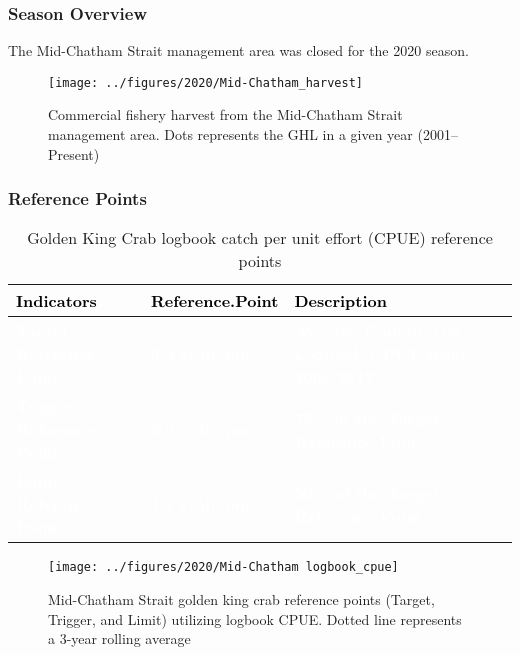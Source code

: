 \documentclass[]{article}
\begin{document}
\subsubsection{Season Overview}\label{season-overview-4}

The Mid-Chatham Strait management area was closed for the 2020 season.

\begin{figure}[H]
\texttt{[image: ../figures/2020/Mid-Chatham\_harvest]} \caption{Commercial fishery harvest from the Mid-Chatham Strait management area. Dots represents the GHL in a given year (2001–Present)}\label{fig:unnamed-chunk-14}
\end{figure}

\subsubsection{Reference Points}\label{reference-points-5}

\begin{table}[!h]

\caption{\label{tab:unnamed-chunk-15}Golden King Crab logbook catch per unit effort (CPUE) reference points}
\centering
\begin{tabular}[t]{l|l|l}
\hline
\textcolor{black}{\textbf{Indicators}} & \textcolor{black}{\textbf{Reference.Point}} & \textcolor{black}{\textbf{Description}}\\
\hline
\rowcolor{gray!6}  \rowcolor{olive}  \textcolor{white}{\textbf{Target Reference Point}} & \textcolor{white}{\textbf{3.4 crab/pot}} & \textcolor{white}{\textbf{Average Commercial Logbook CPUE from 2000-2017}}\\
\hline
\rowcolor{orange}  \textcolor{white}{\textbf{Trigger Reference Point}} & \textcolor{white}{\textbf{2.5 crab/pot}} & \textcolor{white}{\textbf{75\% of the Target Reference Point}}\\
\hline
\rowcolor{gray!6}  \rowcolor{red}  \textcolor{white}{\textbf{Limit Reference Point}} & \textcolor{white}{\textbf{1.7 crab/pot}} & \textcolor{white}{\textbf{50\% of the Target Reference Point}}\\
\hline
\end{tabular}
\end{table}

\begin{figure}[H]
\texttt{[image: ../figures/2020/Mid-Chatham logbook\_cpue]} \caption{Mid-Chatham Strait golden king crab reference points (Target, Trigger, and Limit) utilizing logbook CPUE. Dotted line represents a 3-year rolling average}\label{fig:unnamed-chunk-16}
\end{figure}
\end{document}
